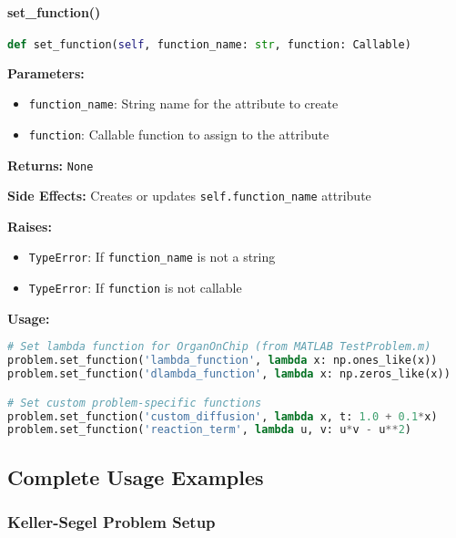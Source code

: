 \paragraph{set\_function()}
\begin{lstlisting}[language=Python, caption=Set Function Method]
def set_function(self, function_name: str, function: Callable)
\end{lstlisting}

\textbf{Parameters:}
\begin{itemize}
    \item \texttt{function\_name}: String name for the attribute to create
    \item \texttt{function}: Callable function to assign to the attribute
\end{itemize}

\textbf{Returns:} \texttt{None}

\textbf{Side Effects:} Creates or updates \texttt{self.function\_name} attribute

\textbf{Raises:}
\begin{itemize}
    \item \texttt{TypeError}: If \texttt{function\_name} is not a string
    \item \texttt{TypeError}: If \texttt{function} is not callable
\end{itemize}

\textbf{Usage:}
\begin{lstlisting}[language=Python, caption=Set Function Usage]
# Set lambda function for OrganOnChip (from MATLAB TestProblem.m)
problem.set_function('lambda_function', lambda x: np.ones_like(x))
problem.set_function('dlambda_function', lambda x: np.zeros_like(x))

# Set custom problem-specific functions
problem.set_function('custom_diffusion', lambda x, t: 1.0 + 0.1*x)
problem.set_function('reaction_term', lambda u, v: u*v - u**2)
\end{lstlisting}

\subsection{Complete Usage Examples}
\label{subsec:complete_usage_examples}

\subsubsection{Keller-Segel Problem Setup}

